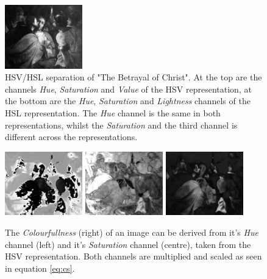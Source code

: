 \documentclass[11pt,a4paper,draft]{report}
\begin{document}
\begin{multicols}{2}
\begin{figure}[tbp]
\includegraphics[width=0.30\textwidth]{L_caravaggio_1962_139_1}
\caption[HSV/HSL separation]{HSV/HSL separation of "The Betrayal of Christ".
At the top are the channels \emph{Hue}, \emph{Saturation} and \emph{Value} of
the HSV representation, at the bottom are the \emph{Hue}, \emph{Saturation} and
\emph{Lightness} channels of the HSL representation.  The \emph{Hue} channel is
the same in both representations, whilst the \emph{Saturation} and the third
channel is different across the representations.}
\label{fig:hsvl}
\end{figure}

\begin{figure}[tbp]
\centering
\includegraphics[width=0.30\textwidth]{H_caravaggio_1962_139_1}
\includegraphics[width=0.30\textwidth]{SHSV_caravaggio_1962_139_1}
\includegraphics[width=0.30\textwidth]{CS_caravaggio_1962_139_1}
\caption[Colourfullness]{The \emph{Colourfullness} (right) of an image can be
derived from it's \emph{Hue} channel (left) and it's \emph{Saturation} channel
(centre), taken from the HSV representation.  Both channels are multiplied and
scaled as seen in equation \ref{eq:cs}.}
\label{fig:cs}
\end{figure}


\end{multicols}
\end{document}
